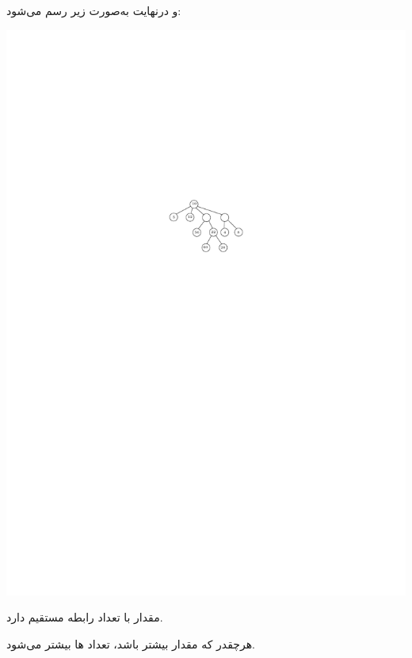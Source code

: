 \begin{qsolve}
	و درنهایت  به‌صورت زیر رسم می‌شود:
	
	\begin{center}
		\includegraphics*[width=0.45\linewidth]{pics/q7c.pdf}
	\end{center}
	
	مقدار
	با تعداد
	رابطه مستقیم دارد.
	
	هرچقدر که مقدار  بیشتر باشد، تعداد  ها بیشتر می‌شود.
	
\end{qsolve}